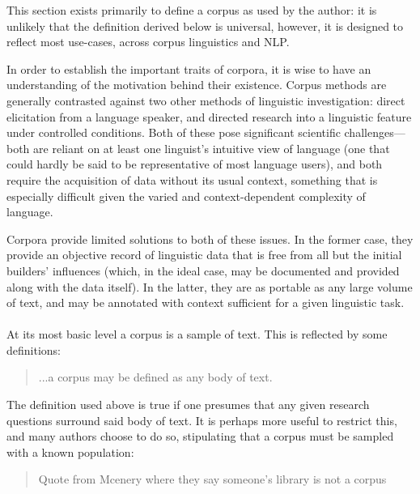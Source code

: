 This section exists primarily to define a corpus as used by the author: it is unlikely that the definition derived below is universal, however, it is designed to reflect most use-cases, across corpus linguistics and NLP.




In order to establish the important traits of corpora, it is wise to have an understanding of the motivation behind their existence.  Corpus methods are generally contrasted against two other methods of linguistic investigation: direct elicitation from a language speaker, and directed research into a linguistic feature under controlled conditions.  Both of these pose significant scientific challenges---both are reliant on at least one linguist's intuitive view of language (one that could hardly be said to be representative of most language users), and both require the acquisition of data without its usual context, something that is especially difficult given the varied and context-dependent complexity of language.

Corpora provide limited solutions to both of these issues.  In the former case, they provide an objective record of linguistic data that is free from all but the initial builders' influences (which, in the ideal case, may be documented and provided along with the data itself).  In the latter, they are as portable as any large volume of text, and may be annotated with context sufficient for a given linguistic task.


\paragraph{}
At its most basic level a corpus is a sample of text.  This is reflected by some definitions\cite[p.29]{mcenery2001corpus}:

\begin{quote}
...a corpus may be defined as any body of text.
\end{quote}

The definition used above is true if one presumes that any given research questions surround said body of text.  It is perhaps more useful to restrict this, and many authors choose to do so, stipulating that a corpus must be sampled with a known population:

\begin{quote}
Quote from Mcenery where they say someone's library is not a corpus
\end{quote}

